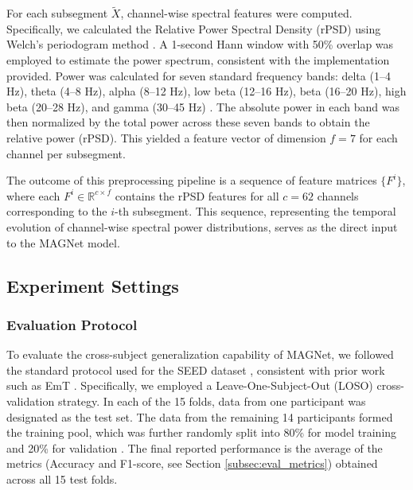 \documentclass[runningheads]{llncs}
\begin{document}
For each subsegment $\tilde{X}$, channel-wise spectral features were computed. Specifically, we calculated the Relative Power Spectral Density (rPSD) using Welch's periodogram method \cite{cite_welch_method}. A 1-second Hann window with 50\% overlap was employed to estimate the power spectrum, consistent with the implementation provided. Power was calculated for seven standard frequency bands: delta (1–4 Hz), theta (4–8 Hz), alpha (8–12 Hz), low beta (12–16 Hz), beta (16–20 Hz), high beta (20–28 Hz), and gamma (30–45 Hz) \cite{cite_ding_emt}. The absolute power in each band was then normalized by the total power across these seven bands to obtain the relative power (rPSD). This yielded a feature vector of dimension $f=7$ for each channel per subsegment.

The outcome of this preprocessing pipeline is a sequence of feature matrices $\{F^i\}$, where each $F^i \in \mathbb{R}^{c \times f}$ contains the rPSD features for all $c=62$ channels corresponding to the $i$-th subsegment. This sequence, representing the temporal evolution of channel-wise spectral power distributions, serves as the direct input to the MAGNet model.





\subsection{Experiment Settings}

\label{subsec:exp_settings}



\subsubsection{Evaluation Protocol}

\label{subsubsec:eval_protocol}



To evaluate the cross-subject generalization capability of MAGNet, we followed the standard protocol used for the SEED dataset \cite{cite_seed_dataset_zheng}, consistent with prior work such as EmT \cite{cite_ding_emt}. Specifically, we employed a Leave-One-Subject-Out (LOSO) cross-validation strategy. In each of the 15 folds, data from one participant was designated as the test set. The data from the remaining 14 participants formed the training pool, which was further randomly split into 80\% for model training and 20\% for validation \cite{cite_ding_emt}. The final reported performance is the average of the metrics (Accuracy and F1-score, see Section \ref{subsec:eval_metrics}) obtained across all 15 test folds.
\end{document}
